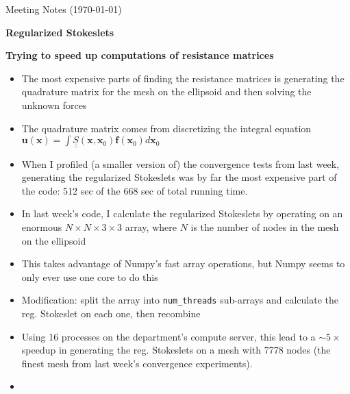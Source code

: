 \documentclass{article}
\begin{document}
\pagestyle{plain}

\begin{center}
  {\Large Meeting Notes (\today)}
\end{center}

\large{\textbf{Regularized Stokeslets}}

\textbf{Trying to speed up computations of resistance matrices}
\begin{itemize}
\item The most expensive parts of finding the resistance matrices is
  generating the quadrature matrix for the mesh on the ellipsoid and
  then solving the unknown forces
\item The quadrature matrix comes from discretizing the integral
  equation $\mathbf{u}(\mathbf{x}) = \int
  \underline{\underline{S}}(\mathbf{x}, \mathbf{x}_0)
  \mathbf{f}(\mathbf{x}_0) d\mathbf{x}_0$
\item When I profiled (a smaller version of) the convergence tests
  from last week, generating the regularized Stokeslets was by far the
  most expensive part of the code: 512 sec of the 668 sec of total
  running time.
\item In last week's code, I calculate the regularized Stokeslets by
  operating on an enormous $N \times N \times 3 \times 3$ array, where
  $N$ is the number of nodes in the mesh on the ellipsoid
\item This takes advantage of Numpy's fast array operations, but Numpy
  seems to only ever use one core to do this
\item Modification: split the array into \texttt{num_threads}
  sub-arrays and calculate the reg. Stokeslet on each one, then
  recombine
\item Using 16 processes on the department's compute server, this lead
  to a $\sim5 \times$ speedup in generating the reg. Stokeslets on a
  mesh with 7778 nodes (the finest mesh from last week's convergence
  experiments).
\item 
\end{itemize}

\end{document}
